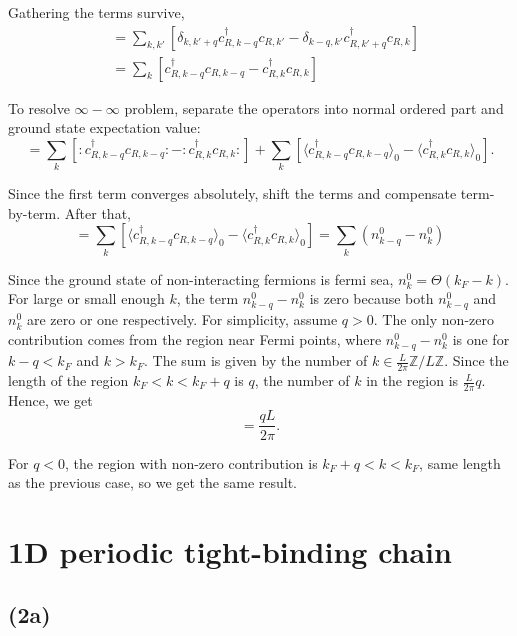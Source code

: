 \documentclass[a4paper,11pt]{article}
\begin{document}
Gathering the terms survive,
\begin{align}
  [n_{R,-q}, n_{R,q}] &= \sum_{k, k'} [\delta_{k, k'+q} c^\dagger_{R,k-q} c_{R,k'} -\delta_{k-q, k'} c^\dagger_{R,k'+q} c_{R,k}]\\
  &= \sum_{k} [c^\dagger_{R,k-q} c_{R,k-q} - c^\dagger_{R,k} c_{R,k}]
\end{align}

To resolve $\infty-\infty$ problem, separate the operators into normal ordered part and ground state expectation value:
\begin{equation}
  [n_{R,-q}, n_{R,q}] = \sum_{k} [:c^\dagger_{R,k-q} c_{R,k-q}: - :c^\dagger_{R,k} c_{R,k}:] + \sum_k [\langle c^\dagger_{R,k-q} c_{R,k-q}\rangle_0 - \langle c^\dagger_{R,k} c_{R,k}\rangle_0].
\end{equation}

Since the first term converges absolutely, shift the terms and compensate term-by-term. After that,
\begin{equation}
  [n_{R,-q}, n_{R,q}] = \sum_k [\langle c^\dagger_{R,k-q} c_{R,k-q}\rangle_0 - \langle c^\dagger_{R,k} c_{R,k}\rangle_0] = \sum_k (n_{k-q}^0 - n_k^0)
\end{equation}

Since the ground state of non-interacting fermions is fermi sea, $n_k^0 = \Theta(k_F - k)$. For large or small enough $k$, the term $n_{k-q}^0 - n_k^0$ is zero because both $n_{k-q}^0$ and $n_k^0$ are zero or one respectively. For simplicity, assume $q > 0$. The only non-zero contribution comes from the region near Fermi points, where $n_{k-q}^0 - n_k^0$ is one for $k -q  < k_F$ and $k > k_F$. The sum is given by the number of $k \in \frac{L}{2\pi}\mathbb{Z}/L\mathbb{Z}$. Since the length of the region $k_F < k < k_F + q$ is $q$, the number of $k$ in the region is $\frac{L}{2\pi}q$. Hence, we get
\begin{equation}
  [n_{R,-q}, n_{R,q}] = \frac{qL}{2\pi}.
\end{equation}

For $q < 0$, the region with non-zero contribution is $k_F + q < k < k_F$, same length as the previous case, so we get the same result.


\section{1D periodic tight-binding chain}

\subsection{(2a)}
\end{document}
